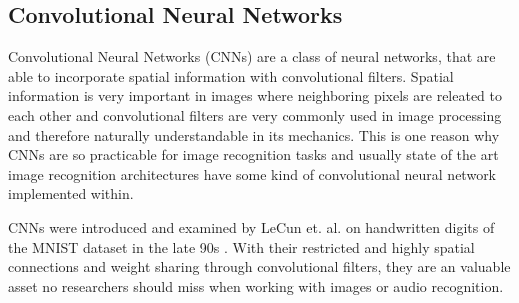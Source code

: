 
\subsection{Convolutional Neural Networks}\label{sec:prev_nn_cnn}
Convolutional Neural Networks (CNNs) are a class of neural networks, that are able to incorporate spatial information with convolutional filters.
Spatial information is very important in images where neighboring pixels are releated to each other and convolutional filters are very commonly used in image processing and therefore naturally understandable in its mechanics.
This is one reason why CNNs are so practicable for image recognition tasks and usually state of the art image recognition architectures have some kind of convolutional neural network implemented within.

CNNs were introduced and examined by LeCun et. al. on handwritten digits of the MNIST dataset in the late 90s
\cite{LeCun1998}.
With their restricted and highly spatial connections and weight sharing through convolutional filters, they are an valuable asset no researchers should miss when working with images or audio recognition.
